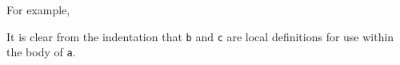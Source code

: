 For example,
\begin{listing}[h!tbp]
\end{listing}

It is clear from the indentation that \texttt{b} and \texttt{c} are local definitions for use within the body of \texttt{a}.


